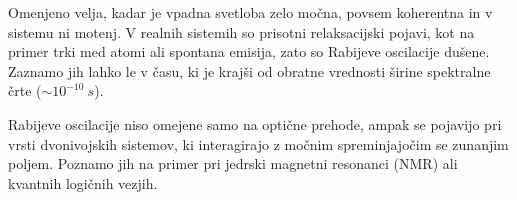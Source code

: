 Omenjeno velja, kadar je vpadna svetloba zelo močna, povsem koherentna in v sistemu ni 
motenj. V realnih sistemih so prisotni relaksacijski pojavi, kot na primer trki med atomi
ali spontana emisija, zato so Rabijeve oscilacije dušene. Zaznamo jih lahko le v času, ki 
je krajši od obratne vrednosti širine spektralne črte ($\sim 10^{-10}~\si{s}$).

\begin{remark}
Rabijeve oscilacije niso omejene samo na optične prehode, ampak se pojavijo pri 
vrsti dvonivojskih sistemov, ki interagirajo z močnim spreminjajočim se zunanjim poljem. 
Poznamo jih na primer pri jedrski magnetni resonanci (NMR) ali kvantnih logičnih vezjih.
\end{remark}
